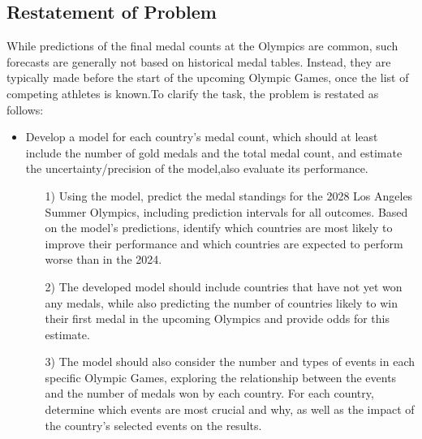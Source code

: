 \documentclass[12pt]{article}  %
\begin{document}
\subsection{Restatement of Problem}
While predictions of the final medal counts at the Olympics are common, such forecasts are generally not based on historical medal tables. Instead, they are typically made before the start of the upcoming Olympic Games, once the list of competing athletes is known.To clarify the task, the problem is restated as follows:

\begin{itemize}
	\setlength{\parsep}{0ex} %
	\setlength{\topsep}{2ex} %
	\setlength{\itemsep}{1ex} %
	\item Develop a model for each country’s medal count, which should at least include the number of gold medals and the total medal count, and estimate the uncertainty/precision of the model,also evaluate its performance.
		\begin{itemize}
		\item[1)]
	Using the model, predict the medal standings for the 2028 Los Angeles Summer Olympics, including prediction intervals for all outcomes. Based on the model’s predictions, identify which countries are most likely to improve their performance and which countries are expected to perform worse than in the 2024.
	\end{itemize}
	\begin{itemize}
		\item[2)]
		The developed model should include countries that have not yet won any medals, while also predicting the number of countries likely to win their first medal in the upcoming Olympics and provide odds for this estimate.
	\end{itemize}
		\begin{itemize}
		\item[3)]
	The model should also consider the number and types of events in each specific Olympic Games, exploring the relationship between the events and the number of medals won by each country. For each country, determine which events are most crucial and why, as well as the impact of the country’s selected events on the results.
	\end{itemize}
	

\end{itemize}
\end{document}

